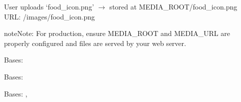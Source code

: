 \documentclass[letterpaper,10pt,english]{sphinxmanual}
\begin{document}
\begin{fulllineitems}
\begin{fulllineitems}
\sphinxAtStartPar
User uploads ‘food\_icon.png’ \(\rightarrow\) stored at MEDIA\_ROOT/food\_icon.png
URL: /images/food\_icon.png

\begin{sphinxadmonition}{note}{Note:}
\sphinxAtStartPar
For production, ensure MEDIA\_ROOT and MEDIA\_URL are properly
configured and files are served by your web server.
\end{sphinxadmonition}

\end{fulllineitems}


\begin{fulllineitems}
\label{\detokenize{expensesApp:expensesApp.models.Category.DoesNotExist}}
\pysigstartsignatures
\pysigline
{}
\pysigstopsignatures
\sphinxAtStartPar
Bases: 

\end{fulllineitems}


\begin{fulllineitems}
\label{\detokenize{expensesApp:expensesApp.models.Category.MultipleObjectsReturned}}
\pysigstartsignatures
\pysigline
{}
\pysigstopsignatures
\sphinxAtStartPar
Bases: 

\end{fulllineitems}


\begin{fulllineitems}
\label{\detokenize{expensesApp:expensesApp.models.Category.NotUpdated}}
\pysigstartsignatures
\pysigline
{}
\pysigstopsignatures
\sphinxAtStartPar
Bases: , 

\end{fulllineitems}



\end{fulllineitems}
\end{document}
